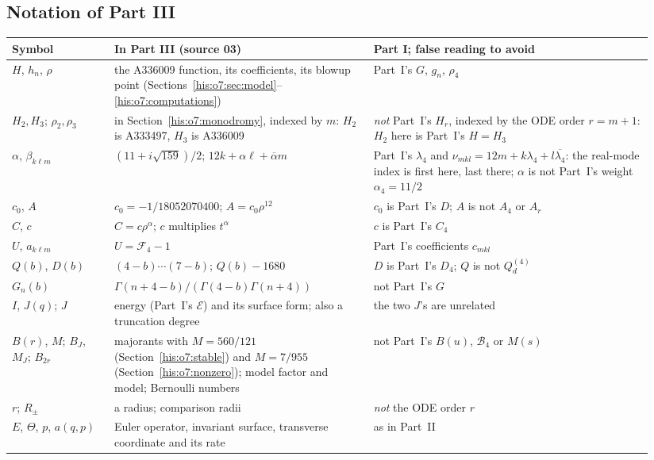 \documentclass[11pt]{article}
\theoremstyle{remark}\newtheorem{remark}[theorem]{Remark}
\newcommand{\la}{\lambda}
\numberwithin{equation}{section}
\begin{document}
\subsection{Notation of Part III}\label{his:o7:sec:notation}
\begin{center}\footnotesize
\begin{tabular}{@{}>{\raggedright\arraybackslash}p{0.15\linewidth}>{\raggedright\arraybackslash}p{0.38\linewidth}>{\raggedright\arraybackslash}p{0.41\linewidth}@{}}
\toprule
Symbol & In Part III (source 03) & Part I; false reading to avoid\\
\midrule
$H$, $h_n$, $\rho$ & the A336009 function, its coefficients, its blowup point (Sections~\ref{his:o7:sec:model}--\ref{his:o7:computations}) & Part~I's $G$, $g_n$, $\rho_4$\\
$H_2,H_3$; $\rho_2,\rho_3$ & in Section~\ref{his:o7:monodromy}, indexed by $m$: $H_2$ is A333497, $H_3$ is A336009 & \emph{not} Part~I's $H_r$, indexed by the ODE order $r=m+1$: $H_2$ here is Part~I's $H=H_3$\\
$\alpha$, $\beta_{k\ell m}$ & $(11+i\sqrt{159})/2$; $12k+\alpha\ell+\overline\alpha m$ & Part~I's $\la_4$ and $\nu_{mkl}=12m+k\la_4+l\overline{\la_4}$: the real-mode index is first here, last there; $\alpha$ is not Part~I's weight $\alpha_4=11/2$\\
$c_0$, $A$ & $c_0=-1/18052070400$; $A=c_0\rho^{12}$ & $c_0$ is Part~I's $D$; $A$ is not $A_4$ or $A_r$\\
$C$, $c$ & $C=c\rho^\alpha$; $c$ multiplies $t^\alpha$ & $c$ is Part~I's $C_4$\\
$U$, $a_{k\ell m}$ & $U=\mathcal F_4-1$ & Part~I's coefficients $c_{mkl}$\\
$Q(b)$, $D(b)$ & $(4-b)\cdots(7-b)$; $Q(b)-1680$ & $D$ is Part~I's $D_4$; $Q$ is not $Q^{(4)}_d$\\
$G_n(b)$ & $\Gamma(n+4-b)/(\Gamma(4-b)\Gamma(n+4))$ & not Part~I's $G$\\
$I$, $J(q)$; $J$ & energy (Part~I's $\mathcal E$) and its surface form; also a truncation degree & the two $J$'s are unrelated\\
$B(r)$, $M$; $B_J$, $M_J$; $B_{2r}$ & majorants with $M=560/121$ (Section~\ref{his:o7:stable}) and $M=7/955$ (Section~\ref{his:o7:nonzero}); model factor and model; Bernoulli numbers & not Part~I's $B(u)$, $\mathcal B_4$ or $M(s)$\\
$r$; $R_\pm$ & a radius; comparison radii & \emph{not} the ODE order $r$\\
$E$, $\Theta$, $p$, $a(q,p)$ & Euler operator, invariant surface, transverse coordinate and its rate & as in Part~II\\

\end{tabular}
\end{center}
\end{document}
